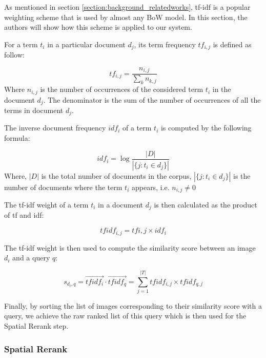 \documentclass[10pt,conference,]{IEEEtran}
\begin{document}
As mentioned in section \ref{section:background_relatedworks}, tf-idf is a popular weighting scheme that is used by almost any BoW model. In this section, the authors will show how this scheme is applied to our system.

For a term $t_{i}$ in a particular document $d_{j}$, its term frequency $tf_{i, j}$ is defined as follow:

\begin{equation} 
        tf_{i, j} = \frac{n_{i, j}}{\sum\limits_{k} n_{k, j}}
\end{equation}
Where $n_{i, j}$ is the number of occurrences of the considered term $t_{i}$ in the document $d_{j}$. The denominator is the sum of the number of occurrences of all the terms in document $d_{j}$.

The inverse document frequency $idf_{i}$ of a term $t_{i}$ is computed by the following formula:

\begin{equation}
        idf_{i} = \log{\frac{\left|D\right|}{\left|\{j: t_{i} \in d_{j}\}\right|}}
\end{equation}
Where, $\left|D\right|$ is the total number of documents in the corpus, $\left|\{j: t_{i} \in d_{j}\}\right|$ is the number of documents where the term $t_{i}$ appears, i.e. $n_{i, j} \ne 0$

The tf-idf weight of a term $t_{i}$ in a document $d_{j}$ is then calculated as the product of tf and idf:

\begin{equation}
{tfidf}_{i, j} = tf{i, j} \times idf_{i}
\end{equation}

The tf-idf weight is then used to compute the similarity score between an image $d_{i}$ and a query $q$:

\begin{equation}
s_{d_{i}, q} = \vec{{tfidf}_{i}} \cdot \vec{{tfidf}_{q}} = \sum\limits_{j = 1}^{\left|T\right|} {tfidf}_{i, j} \times {tfidf}_{q, j}
\end{equation} 

Finally, by sorting the list of images corresponding to their similarity score with a query, we achieve the raw ranked list of this query which is then used for the Spatial Rerank step.

\subsubsection{Spatial Rerank} \label{section:spatial_rerank}
\end{document}
